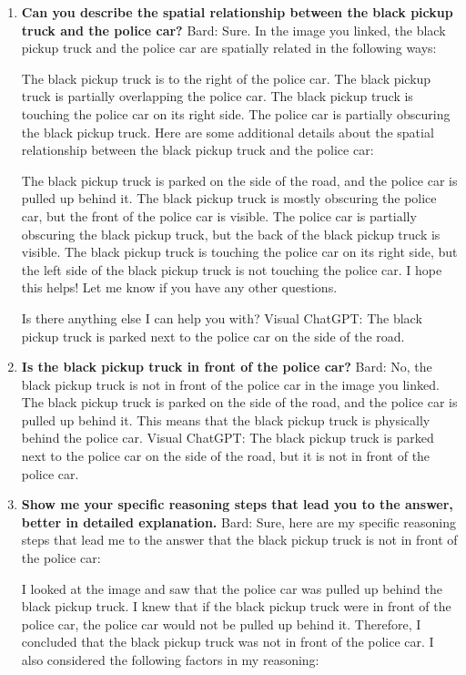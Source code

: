     \begin{enumerate}
        \item \textbf{Can you describe the spatial relationship between the  black pickup truck and the police car?}
        \subitem Bard: Sure. In the image you linked, the black pickup truck and the police car are spatially related in the following ways:

        The black pickup truck is to the right of the police car.
        The black pickup truck is partially overlapping the police car.
        The black pickup truck is touching the police car on its right side.
        The police car is partially obscuring the black pickup truck.
        Here are some additional details about the spatial relationship between the black pickup truck and the police car:
        
        The black pickup truck is parked on the side of the road, and the police car is pulled up behind it.
        The black pickup truck is mostly obscuring the police car, but the front of the police car is visible.
        The police car is partially obscuring the black pickup truck, but the back of the black pickup truck is visible.
        The black pickup truck is touching the police car on its right side, but the left side of the black pickup truck is not touching the police car.
        I hope this helps! Let me know if you have any other questions.
        
        Is there anything else I can help you with?
        \subitem Visual ChatGPT: The black pickup truck is parked next to the police car on the side of the road.
        \item \textbf{Is the black pickup truck in front of the police car?}
        \subitem Bard: No, the black pickup truck is not in front of the police car in the image you linked. The black pickup truck is parked on the side of the road, and the police car is pulled up behind it. This means that the black pickup truck is physically behind the police car.
        \subitem Visual ChatGPT: The black pickup truck is parked next to the police car on the side of the road, but it is not in front of the police car.
        \item \textbf{Show me your specific reasoning steps that lead you to the answer, better in detailed explanation.}
        \subitem Bard: 
        Sure, here are my specific reasoning steps that lead me to the answer that the black pickup truck is not in front of the police car:
        
        I looked at the image and saw that the police car was pulled up behind the black pickup truck.
        I knew that if the black pickup truck were in front of the police car, the police car would not be pulled up behind it.
        Therefore, I concluded that the black pickup truck was not in front of the police car.
        I also considered the following factors in my reasoning:
        

\end{enumerate}
